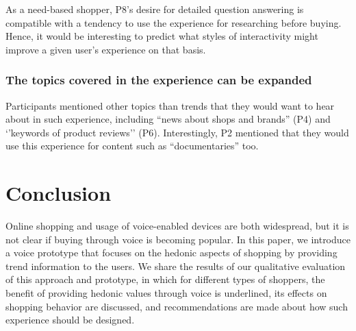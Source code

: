 As a need-based shopper, P8's desire for detailed question answering is compatible with a tendency to use the experience for researching before buying. Hence, it would be interesting to predict what styles of interactivity might improve a given user's experience on that basis.

\subsubsection{\textbf{The topics covered in the experience can be expanded}} Participants mentioned other topics than trends that they would want to hear about in such experience, including ``news about shops and brands'' (P4) and `'keywords of product reviews'' (P6). Interestingly, P2 mentioned that they would use this experience for content such as ``documentaries'' too.

\section{Conclusion}
Online shopping and usage of voice-enabled devices are both widespread, but it is not clear if buying through voice is becoming popular. In this paper, we introduce a voice prototype that focuses on the hedonic aspects of shopping by providing trend information to the users. We share the results of our qualitative evaluation of this approach and prototype, in which for different types of shoppers, the benefit of providing hedonic values through voice is underlined, its effects on shopping behavior are discussed, and recommendations are made about how such experience should be designed. 

